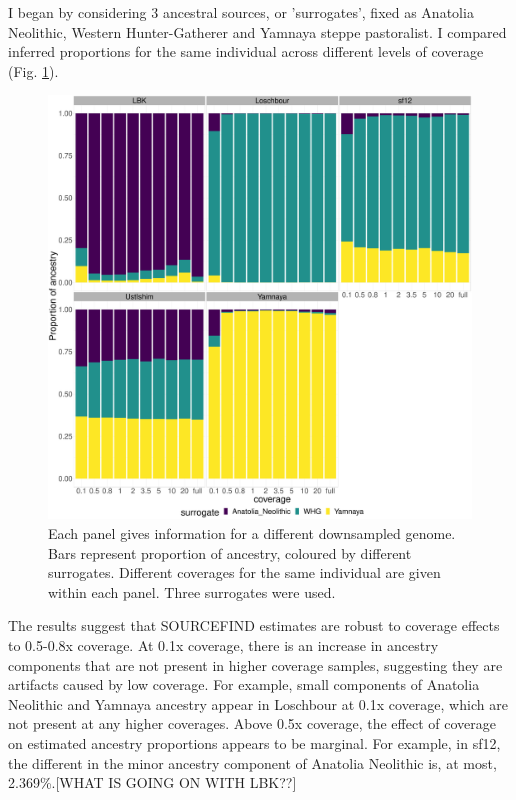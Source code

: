 I began by considering 3 ancestral sources, or 'surrogates', fixed as Anatolia Neolithic, Western Hunter-Gatherer and Yamnaya steppe pastoralist. I compared inferred proportions for the same individual across different levels of coverage (Fig. \ref{fig:3pop_SF_downsampled}). 

\begin{figure}[htp]
    \centering
    \includegraphics[width=1.0\textwidth]{../images/chapter1/3pop_SF_downsampled.pdf}
    \caption{Each panel gives information for a different downsampled genome. Bars represent proportion of ancestry, coloured by different surrogates. Different coverages for the same individual are given within each panel. Three surrogates were used.}
    \label{fig:3pop_SF_downsampled}
\end{figure}

The results suggest that SOURCEFIND estimates are robust to coverage effects to 0.5-0.8x coverage. At 0.1x coverage, there is an increase in ancestry components that are not present in higher coverage samples, suggesting they are artifacts caused by low coverage. For example, small components of Anatolia Neolithic and Yamnaya ancestry appear in Loschbour at 0.1x coverage, which are not present at any higher coverages. Above 0.5x coverage, the effect of coverage on estimated ancestry proportions appears to be marginal. For example, in sf12, the different in the minor ancestry component of Anatolia Neolithic is, at most, 2.369\%.{\color{red}[WHAT IS GOING ON WITH LBK??]} 

